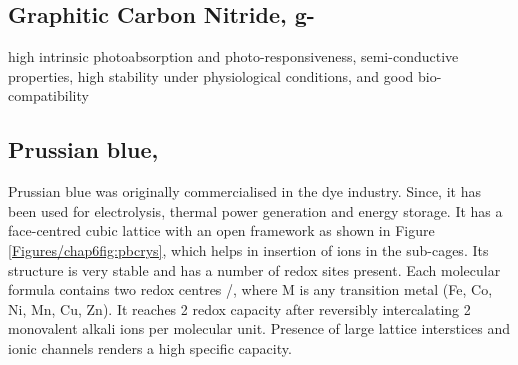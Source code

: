 \subsection*{Graphitic Carbon Nitride, g-}
high intrinsic photoabsorption and photo-responsiveness, semi-conductive properties, high stability under physiological conditions, and good bio-compatibility







\subsection*{Prussian blue, }
Prussian blue was originally commercialised in the dye industry. Since, it has been used for electrolysis, thermal power generation and energy storage. It has a face-centred cubic lattice with an open framework as shown in Figure \ref{Figures/chap6fig:pbcrys}, which helps in insertion of ions in the sub-cages. Its structure is very stable and has a number of redox sites present. Each molecular formula contains two redox centres /, where M is any transition metal (Fe, Co, Ni, Mn, Cu, Zn). It reaches 2 redox capacity after reversibly intercalating 2 monovalent alkali ions per molecular unit. Presence of large lattice interstices and ionic channels renders a high specific capacity. 







